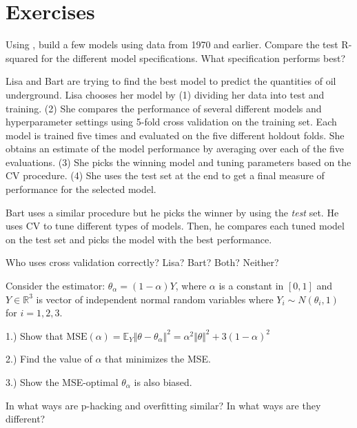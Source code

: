 \section{Exercises}

\begin{tcolorbox}[breakable, size=fbox, boxrule=1pt, pad at break*=1mm,colback=cellbackground, colframe=cellborder, title=Exercise: Tufte Model Comparison]
Using , build a few models using data from 1970 and earlier. Compare the test R-squared for the different model specifications. What specification performs best?
\end{tcolorbox}

\begin{tcolorbox}[breakable, size=fbox, boxrule=1pt, pad at break*=1mm,colback=cellbackground, colframe=cellborder, title=Exercise: Cross-Validation Usage]
Lisa and Bart are trying to find the best model to predict the quantities of oil underground. Lisa chooses her model by (1) dividing her data into test and training. (2) She compares the performance of several different models and hyperparameter settings using 5-fold cross validation on the training set. Each model is trained five times and evaluated on the five different holdout folds. She obtains an estimate of the model performance by averaging over each of the five evaluations. (3) She picks the winning model and tuning parameters based on the CV procedure. (4) She uses the test set at the end to get a final measure of performance for the selected model.

Bart uses a similar procedure but he picks the winner by using the \textit{test} set. He uses CV to tune different types of models. Then, he compares each tuned model on the test set and picks the model with the best performance.

Who uses cross validation correctly? Lisa? Bart? Both? Neither?
\end{tcolorbox}

\begin{tcolorbox}[breakable, size=fbox, boxrule=1pt, pad at break*=1mm,colback=cellbackground, colframe=cellborder, title=Exercise: James-Stein Estimator]
Consider the estimator: $\theta_\alpha = (1 - \alpha)Y$, where $\alpha$ is a constant in $[0,1]$ and $Y\in \mathbb{R}^3$ is vector of independent normal random variables where $Y_i\sim N(\theta_i, 1)$ for $i=1,2,3$.

1.) Show that $\mathrm{MSE}(\alpha) = \mathbb{E}_Y \Vert \theta - \theta_\alpha \Vert^2  = \alpha^2 \Vert \theta \Vert^2 + 3(1-\alpha)^2 $

2.) Find the value of $\alpha$ that minimizes the MSE.

3.) Show the MSE-optimal $\theta_\alpha$ is also biased.
\end{tcolorbox}

\begin{tcolorbox}[breakable, size=fbox, boxrule=1pt, pad at break*=1mm,colback=cellbackground, colframe=cellborder, title=Exercise: P-hacking vs Overfitting]
In what ways are p-hacking and overfitting similar? In what ways are they different?
\end{tcolorbox}